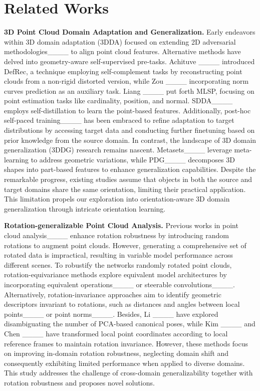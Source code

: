 \section{Related Works}
\noindent\textbf{3D Point Cloud Domain Adaptation and Generalization.}
Early endeavors within 3D domain adaptation (3DDA) focused on extending 2D adversarial methodologies____ to align point cloud features. Alternative methods have delved into geometry-aware self-supervised pre-tasks. Achituve \etal____ introduced DefRec, a technique employing self-complement tasks by reconstructing point clouds from a non-rigid distorted version, while Zou \etal____ incorporating norm curves prediction as an auxiliary task. Liang \etal____ put forth MLSP, focusing on point estimation tasks like cardinality, position, and normal. SDDA____ employs self-distillation to learn the point-based features. Additionally, post-hoc self-paced training____ has been embraced to refine adaptation to target distributions by accessing target data and conducting further finetuning based on prior knowledge from the source domain.
In contrast, the landscape of 3D domain generalization (3DDG) research remains nascent. Metasets____ leverage meta-learning to address geometric variations, while PDG____ decomposes 3D shapes into part-based features to enhance generalization capabilities.
Despite the remarkable progress, existing studies assume that objects in both the source and target domains share the same orientation, limiting their practical application. This limitation propels our exploration into orientation-aware 3D domain generalization through intricate orientation learning.


\noindent\textbf{Rotation-generalizable Point Cloud Analysis.}
Previous works in point cloud analysis____ enhance rotation robustness by introducing random rotations to augment point clouds. {However, generating a comprehensive set of rotated data is impractical, resulting in variable model performance across different scenes. To robustify the networks \wrt randomly rotated point clouds,} rotation-equivariance methods explore equivalent model architectures by incorporating equivalent operations____ or steerable convolutions____.
Alternatively, rotation-invariance approaches aim to identify geometric descriptors invariant to rotations, such as distances and angles between local points____ or point norms____. Besides, {Li \etal____ have explored disambiguating the number of PCA-based canonical poses, while Kim \etal____ and Chen \etal____ have transformed local point coordinates according to local reference frames to maintain rotation invariance. However, these methods focus on improving in-domain rotation robustness, neglecting domain shift and consequently exhibiting limited performance when applied to diverse domains. This study addresses the challenge of cross-domain generalizability together with rotation robustness and proposes novel solutions.} 

